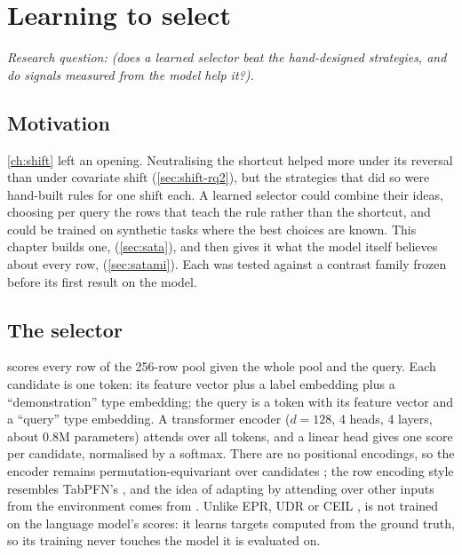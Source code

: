 \chapter{Learning to select}
\label{ch:sata}

\emph{Research question:  (does a learned selector beat the hand-designed strategies, and do signals measured from the model help it?).}

\section{Motivation}

\autoref{ch:shift} left an opening.
Neutralising the shortcut helped more under its reversal than under covariate shift (\autoref{sec:shift-rq2}), but the strategies that did so were hand-built rules for one shift each.
A learned selector could combine their ideas, choosing per query the rows that teach the rule rather than the shortcut, and could be trained on synthetic tasks where the best choices are known.
This chapter builds one, \sata (\autoref{sec:sata}), and then gives it what the model itself believes about every row, \satami (\autoref{sec:satami}).
Each was tested against a contrast family frozen before its first result on the model.

\section{The selector}
\label{sec:sata-arch}

\sata scores every row of the 256-row pool given the whole pool and the query.
Each candidate is one token: its feature vector plus a label embedding plus a ``demonstration'' type embedding; the query is a token with its feature vector and a ``query'' type embedding.
A transformer encoder ($d = 128$, 4 heads, 4 layers, about 0.8M parameters) attends over all tokens, and a linear head gives one score per candidate, normalised by a softmax.
There are no positional encodings, so the encoder remains permutation-equivariant over candidates \citep{lee2019set}; the row encoding style resembles TabPFN's \citep{hollmann2023tabpfn}, and the idea of adapting by attending over other inputs from the environment comes from \citet{gupta2024context}.
Unlike EPR, UDR or CEIL \citep{rubin2022learning,li2023unified,ye2023compositional}, \sata is not trained on the language model's scores: it learns targets computed from the ground truth, so its training never touches the model it is evaluated on.

